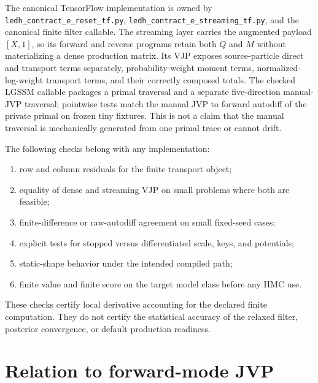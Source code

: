 The canonical TensorFlow implementation is owned by
\texttt{ledh\_contract\_e\_reset\_tf.py},
\texttt{ledh\_contract\_e\_streaming\_tf.py}, and the canonical finite filter
callable.  The streaming layer carries the augmented payload \([X,1]\), so its
forward and reverse programs retain both \(Q\) and \(M\) without materializing a
dense production matrix.  Its VJP exposes source-particle direct and transport
terms separately, probability-weight moment terms, normalized-log-weight
transport terms, and their correctly composed totals.  The checked LGSSM
callable packages a primal traversal and a separate five-direction manual-JVP
traversal; pointwise tests match the manual JVP to forward autodiff of the
private primal on frozen tiny fixtures.  This is not a claim that the manual
traversal is mechanically generated from one primal trace or cannot drift.

The following checks belong with any implementation:
\begin{enumerate}[label=(\arabic*)]
  \item row and column residuals for the finite transport object;
  \item equality of dense and streaming VJP on small problems where both are
  feasible;
  \item finite-difference or raw-autodiff agreement on small fixed-seed cases;
  \item explicit tests for stopped versus differentiated scale, keys, and
  potentials;
  \item static-shape behavior under the intended compiled path;
  \item finite value and finite score on the target model class before any HMC
  use.
\end{enumerate}

These checks certify local derivative accounting for the declared finite
computation.  They do not certify the statistical accuracy of the relaxed
filter, posterior convergence, or default production readiness.

\section{Relation to forward-mode JVP}
\label{sec:bf-ledh-ot-jvp}

